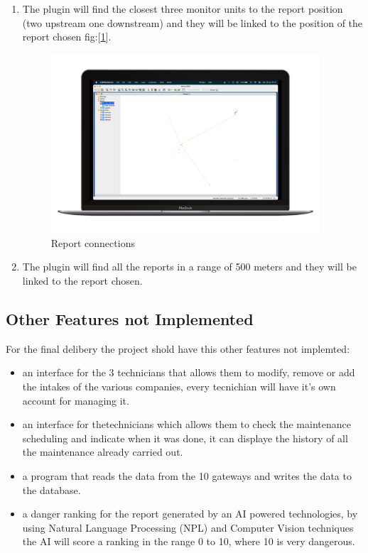 \begin{enumerate}
    \item The plugin will find the closest three monitor units to the report position (two upstream one downstream) and they will be linked to the position of the report chosen fig:[\ref{optuTorial3}].
    \begin{figure}[H]
        \centering
        \includegraphics[width=27em]{img/op3.png} \caption{Report connections} \label{optuTorial3}
    \end{figure}

    \item The plugin will find all the reports in a range of 500 meters and they will be linked to the report chosen.
\end{enumerate}



\subsection{Other Features not Implemented}

For the final delibery the project shold have this other features not implemted:

\begin{itemize}
    \item an interface for the 3 technicians that allows them to modify, remove or add the intakes of the various companies, every tecnichian will have it's own account for managing it.
    \item an interface for thetechnicians which allows them to check the maintenance scheduling and indicate when it was done, it can displaye the history of all the maintenance already carried out.
    \item a program that reads the data from the 10 gateways and writes the data to the database.
    \item a danger ranking for the report generated by an AI powered technologies, by using Natural Language Processing (NPL) and Computer Vision techniques the AI will score a ranking in the range 0 to 10, where 10 is very dangerous.
\end{itemize}

